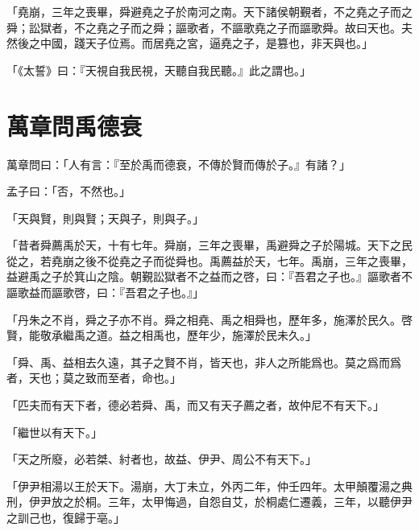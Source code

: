 「堯崩，三年之喪畢，舜避堯之子於南河之南。天下諸侯朝覲者，不之堯之子而之舜；訟獄者，不之堯之子而之舜；謳歌者，不謳歌堯之子而謳歌舜。故曰天也。夫然後之中國，踐天子位焉。而居堯之宮，逼堯之子，是篡也，非天與也。」

「《太誓》曰：『天視自我民視，天聽自我民聽。』此之謂也。」\par {}

\section{萬章問禹德衰}

萬章問曰：「人有言：『至於禹而德衰，不傳於賢而傳於子。』有諸？」

孟子曰：「否，不然也。」

「天與賢，則與賢；天與子，則與子。」

「昔者舜薦禹於天，十有七年。舜崩，三年之喪畢，禹避舜之子於陽城。天下之民從之，若堯崩之後不從堯之子而從舜也。禹薦益於天，七年。禹崩，三年之喪畢，益避禹之子於箕山之陰。朝覲訟獄者不之益而之啓，曰：『吾君之子也。』謳歌者不謳歌益而謳歌啓，曰：『吾君之子也。』」

「丹朱之不肖，舜之子亦不肖。舜之相堯、禹之相舜也，歷年多，施澤於民久。啓賢，能敬承繼禹之道。益之相禹也，歷年少，施澤於民未久。」

「舜、禹、益相去久遠，其子之賢不肖，皆天也，非人之所能爲也。莫之爲而爲者，天也；莫之致而至者，命也。」

「匹夫而有天下者，德必若舜、禹，而又有天子薦之者，故仲尼不有天下。」

「繼世以有天下。」

「天之所廢，必若桀、紂者也，故益、伊尹、周公不有天下。」

「伊尹相湯以王於天下。湯崩，大丁未立，外丙二年，仲壬四年。太甲顛覆湯之典刑，伊尹放之於桐。三年，太甲悔過，自怨自艾，於桐處仁遷義，三年，以聽伊尹之訓己也，復歸于亳。」

